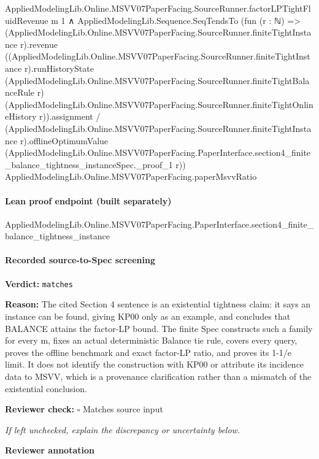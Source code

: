 \documentclass[10pt]{article}
\newcommand{\reviewerbox}{%
  \par\noindent\fbox{\parbox{0.96\linewidth}{\rule{0pt}{0.38in}}}\par
}
\newcommand{\reviewmatch}[1]{%
  \par\noindent\textbf{Reviewer check:} $\square$\; #1\par
  \noindent\emph{If left unchecked, explain the discrepancy or uncertainty below.}\par
}
\begin{document}
\begin{ReviewVerbatim}
            AppliedModelingLib.Online.MSVV07PaperFacing.SourceRunner.factorLPTightFluidRevenue m 1 ∧
          AppliedModelingLib.Sequence.SeqTendsTo
            (fun (r : ℕ) =>
              (AppliedModelingLib.Online.MSVV07PaperFacing.SourceRunner.finiteTightInstance r).revenue
                  ((AppliedModelingLib.Online.MSVV07PaperFacing.SourceRunner.finiteTightInstance r).runHistoryState
                      (AppliedModelingLib.Online.MSVV07PaperFacing.SourceRunner.finiteTightBalanceRule r)
                      (AppliedModelingLib.Online.MSVV07PaperFacing.SourceRunner.finiteTightOnlineHistory
                        r)).assignment /
                (AppliedModelingLib.Online.MSVV07PaperFacing.SourceRunner.finiteTightInstance r).offlineOptimumValue
                  (AppliedModelingLib.Online.MSVV07PaperFacing.PaperInterface.section4_finite_balance_tightness_instanceSpec._proof_1
                    r))
            AppliedModelingLib.Online.MSVV07PaperFacing.paperMsvvRatio
\end{ReviewVerbatim}

\paragraph{Lean proof endpoint (built separately)}\begin{ReviewVerbatim}
AppliedModelingLib.Online.MSVV07PaperFacing.PaperInterface.section4_finite_balance_tightness_instance
\end{ReviewVerbatim}

\paragraph{Recorded source-to-Spec screening}
\textbf{Verdict:} \texttt{matches}
\\
{\raggedright
\textbf{Reason:} The cited Section 4 sentence is an existential tightness claim:\allowbreak{} it says an instance can be found, giving KP00 only as an example, and concludes that BALANCE attains the factor-\allowbreak{}LP bound.\allowbreak{} The finite Spec constructs such a family for every m, fixes an actual deterministic Balance tie rule, covers every query, proves the offline benchmark and exact factor-\allowbreak{}LP ratio, and proves its 1-\allowbreak{}1/\allowbreak{}e limit.\allowbreak{} It does not identify the construction with KP00 or attribute its incidence data to MSVV, which is a provenance clarification rather than a mismatch of the existential conclusion.\allowbreak{}
\par}
\reviewmatch{Matches source input}
\noindent\textbf{Reviewer annotation}\par
\reviewerbox
\clearpage
\hypertarget{source-claim-f07febc56b86dab1}{}
\end{document}
